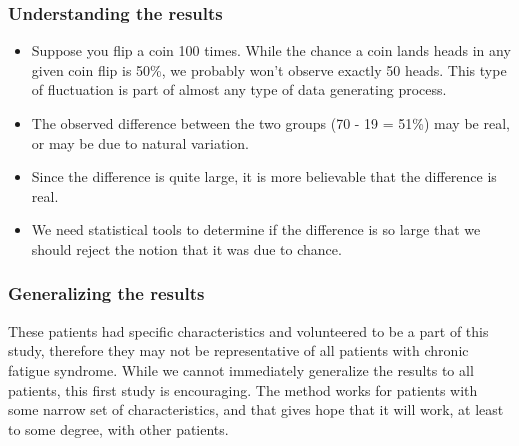 \documentclass[slidestop,compress,mathserif]{beamer}
\begin{document}
\begin{frame}
\frametitle{Understanding the results}



\begin{itemize}

\item Suppose you flip a coin 100 times. While the chance a coin lands heads in any given coin flip is 50\%, we probably won't observe exactly 50 heads. This type of fluctuation is part of almost any type of data generating process.

\item The observed difference between the two groups (70 - 19 = 51\%) may be real, or may be due to natural variation.

\item Since the difference is quite large, it is more believable that the difference is real.

\item We need statistical tools to determine if the difference is so large that we should reject the notion that it was due to chance.

\end{itemize}

\end{frame}


\begin{frame}
\frametitle{Generalizing the results}



These patients had specific characteristics and volunteered to be a part of this study, therefore they may not be representative of all patients with chronic fatigue syndrome. While we cannot immediately generalize the results to all patients, this first study is encouraging. The method works for patients with some narrow set of characteristics, and that gives hope that it will work, at least to some degree, with other patients.


\end{frame}

\end{document}
